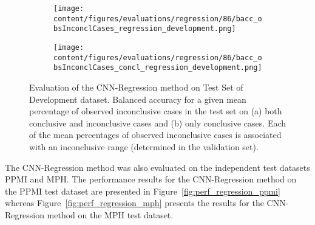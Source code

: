 \begin{figure}[ht]
  \begin{subfigure}{0.9\textwidth}
    \centering
    \texttt{[image: content/figures/evaluations/regression/86/bacc\_obsInconclCases\_regression\_development.png]}
    \subcaption{}
    \label{fig:bacc_obsInconclCases_regression_development}
  \end{subfigure}
  \hfill
  \begin{subfigure}{0.9\textwidth}
    \centering
    \texttt{[image: content/figures/evaluations/regression/86/bacc\_obsInconclCases\_concl\_regression\_development.png]}
    \subcaption{}
    \label{fig:bacc_obsInconclCases_concl_regression_development}
  \end{subfigure}

  \caption{Evaluation of the CNN-Regression method on Test Set of Development dataset.
  Balanced accuracy for a given mean percentage of observed inconclusive cases in the test set on 
  (a) both conclusive and inconclusive cases and (b) only conclusive cases. 
  Each of the mean percentages of observed inconclusive cases is associated with an inconclusive range (determined in the validation set). }
  \label{fig:bacc_obsInconclCases_regression_development_full}
\end{figure}



The CNN-Regression method was also evaluated on the independent test datasets PPMI and MPH.
The performance results for the CNN-Regression method on the PPMI test dataset are presented in Figure~\ref{fig:perf_regression_ppmi} 
whereas Figure~\ref{fig:perf_regression_mph} presents the results for the CNN-Regression method on the MPH test dataset.



